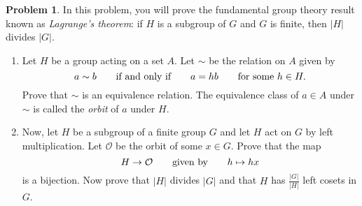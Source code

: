 \documentclass[letterpaper,11pt]{amsart}
\theoremstyle{plain}
\theoremstyle{definition}
\newtheorem{pr}{Problem}
\theoremstyle{remark}
\begin{document}
\begin{pr}
    In this problem, you will prove the fundamental group theory result known as \emph{Lagrange's theorem}:
    if $H$ is a subgroup of $G$ and $G$ is finite, then $|H|$ divides $|G|$.
    \begin{enumerate}
        \item Let $H$ be a group acting on a set $A$. Let $\sim$ be the relation on $A$ given by
            \[
                a \sim b \qquad \textnormal{if and only if} \qquad a = hb \qquad \textnormal{for some } h \in H.
            \]
            Prove that $\sim$ is an equivalence relation.
            The equivalence class of $a \in A$ under $\sim$ is called the \emph{orbit} of $a$ under $H$.
        \item Now, let $H$ be a subgroup of a finite group $G$ and let $H$ act on $G$ by left multiplication.
            Let $\mathcal{O}$ be the orbit of some $x \in G$.
            Prove that the map
            \[
                H\rightarrow \mathcal{O} \qquad \textnormal{given by} \qquad h \mapsto hx
            \]
            is a bijection. Now prove that $|H|$ divides $|G|$ and that $H$ has $\frac{|G|}{|H|}$ left cosets in $G$.
    \end{enumerate}
\end{pr}
\end{document}
